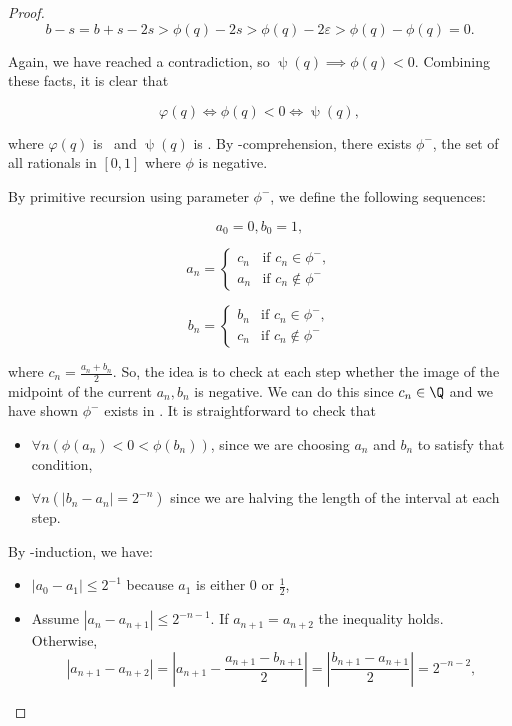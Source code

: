 \documentclass[../main.tex]{memoir}
\begin{document}
\begin{proof}
  \[ b - s = b + s - 2s > \phi(q) - 2s > \phi(q) - 2\varepsilon > \phi(q) - \phi(q) = 0. \]

  Again, we have reached a contradiction, so $\uppsi(q) \implies \phi(q) < 0$. Combining these facts, it is clear that

  \[ \varphi(q) \iff \phi(q) < 0 \iff \uppsi(q), \]

  where $\varphi(q)$ is \re\ and $\uppsi(q)$ is \core. By \rec-comprehension, there exists $\phi^-$, the set of all rationals in $[0, 1]$ where $\phi$ is negative.

  By primitive recursion using parameter $\phi^-$, we define the following sequences:

  \[ a_0 = 0, b_0 = 1, \]

  \[
    a_n =
    \begin{cases}
      c_n & \text{if } c_n \in \phi^-, \\
      a_n & \text{if } c_n \not\in \phi^-
    \end{cases}
  \]

  \[
    b_n =
    \begin{cases}
      b_n & \text{if } c_n \in \phi^-, \\
      c_n & \text{if } c_n \not\in \phi^-
    \end{cases}
  \]

  where $c_n = \frac{a_n + b_n}{2}$. So, the idea is to check at each step whether the image of the midpoint of the current $a_n, b_n$ is negative. We can do this since $c_n \in \Q$ and we have shown $\phi^-$ exists in \rca. It is straightforward to check that

  \begin{itemize}
  \item $\forall n (\phi(a_n) < 0 < \phi(b_n))$, since we are choosing $a_n$ and $b_n$ to satisfy that condition,
  \item $\forall n (|b_n - a_n| = 2^{-n})$ since we are halving the length of the interval at each step.
  \end{itemize}

  By \re-induction, we have:

  \begin{itemize}
  \item $|a_0 - a_1| \le 2^{-1}$ because $a_1$ is either $0$ or $\frac12$,
  \item Assume $|a_n - a_{n + 1}| \le 2^{-n - 1}$. If $a_{n + 1} = a_{n + 2}$ the inequality holds. Otherwise,
    \[ |a_{n + 1} - a_{n + 2}| = \left\lvert a_{n + 1} - \frac{a_{n + 1} - b_{n + 1}}{2} \right\rvert = \left\lvert \frac{b_{n + 1} - a_{n + 1}}{2} \right\rvert = 2^{-n - 2}, \]
  \end{itemize}


\end{proof}
\end{document}
